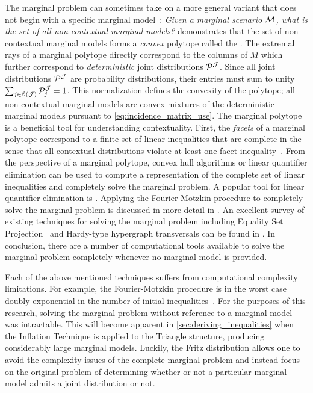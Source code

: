 \documentclass[aps, 10pt, english, twoside, pra, nofootinbib, tightenlines, longbibliography, superscriptaddress]{revtex4-1}
\begin{document}
    The marginal problem can sometimes take on a more general variant that does not begin with a specific marginal model~\cite{Abramsky_2012,Mansfield_2012,Fritz_2011}: \textit{Given a marginal scenario $\mathcal{M}$, what is the set of all non-contextual marginal models?} \citet{Pitowsky_1991} demonstrates that the set of non-contextual marginal models forms a \textit{convex} polytope called the . The extremal rays of a marginal polytope directly correspond to the columns of $M$ which further correspond to \textit{deterministic} joint distributions $\probvec^{\jointvar}$. Since all joint distributions $\probvec^{\jointvar}$ are probability distributions, their entries must sum to unity $\sum_{j \in \Events{\jointvar}} \probvec^{\jointvar}_j = 1$. This normalization defines the convexity of the polytope; all non-contextual marginal models are convex mixtures of the deterministic marginal models pursuant to \cref{eq:incidence_matrix_use}. The marginal polytope is a beneficial tool for understanding contextuality. First, the \textit{facets} of a marginal polytope correspond to a finite set of linear inequalities that are complete in the sense that all contextual distributions violate at least one facet inequality~\cite{Brunner_2013}. From the perspective of a marginal polytope, convex hull algorithms or linear quantifier elimination can be used to compute a representation of the complete set of linear inequalities and completely solve the marginal problem. A popular tool for linear quantifier elimination is  \cite{Dantzig_1973,Inflation,Abramsky_2012}. Applying the Fourier-Motzkin procedure to completely solve the marginal problem is discussed in more detail in \citet{Fritz_2011}. An excellent survey of existing techniques for solving the marginal problem including Equality Set Projection~\cite{jones_2004} and Hardy-type hypergraph transversals can be found in \citet{Inflation}. In conclusion, there are a number of computational tools available to solve the marginal problem completely whenever no marginal model is provided.

    Each of the above mentioned techniques suffers from computational complexity limitations. For example, the Fourier-Motzkin procedure is in the worst case doubly exponential in the number of initial inequalities~\cite{Dantzig_1973}. For the purposes of this research, solving the marginal problem without reference to a marginal model was intractable. This will become apparent in \cref{sec:deriving_inequalities} when the Inflation Technique is applied to the Triangle structure, producing considerably large marginal models. Luckily, the Fritz distribution allows one to avoid the complexity issues of the complete marginal problem and instead focus on the original problem of determining whether or not a particular marginal model admits a joint distribution or not.
\end{document}
